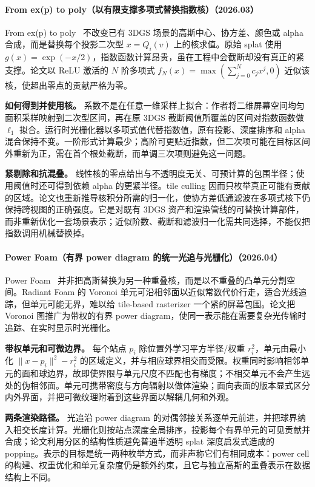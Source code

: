 \paragraph{From ex(p) to poly（以有限支撑多项式替换指数核）（2026.03）}
From ex(p) to poly~\cite{2603_18707} 不改变已有 3DGS 场景的高斯中心、协方差、颜色或 alpha 合成，而是替换每个投影二次型 $x=Q_i(v)$ 上的核求值。原始 splat 使用 $g(x)=\exp(-x/2)$，指数函数计算昂贵，虽在工程中会截断却没有真正的紧支撑。论文以 ReLU 激活的 $N$ 阶多项式 $f_N(x)=\max(\sum_{j=0}^N c_jx^j,0)$ 近似该核，使超出零点的贡献严格为零。

\textbf{如何得到并使用核。} 系数不是在任意一维采样上拟合：作者将二维屏幕空间均匀面积采样映射到二次型区间，再在原 3DGS 截断阈值所覆盖的区间对指数函数做 $\ell_1$ 拟合。运行时光栅化器以多项式值代替指数值，原有投影、深度排序和 alpha 混合保持不变。一阶形式计算最少；高阶可更贴近指数，但二次项可能在目标区间外重新为正，需在首个根处截断，而单调三次项则避免这一问题。

\textbf{紧剔除和抗混叠。} 线性核的零点给出与不透明度无关、可预计算的包围半径；使用阈值时还可得到依赖 alpha 的更紧半径。tile culling 因而只枚举真正可能有贡献的区域。论文也重新推导核积分所需的归一化，使协方差低通滤波在多项式核下仍保持跨视图的正确强度。它是对既有 3DGS 资产和渲染管线的可替换计算部件，而非重新优化一套场景表示；近似阶数、截断和滤波归一化需共同选择，不能仅把指数调用机械替换掉。

\paragraph{Power Foam（有界 power diagram 的统一光追与光栅化）（2026.04）}
Power Foam~\cite{2604_24994} 并非把高斯替换为另一种重叠核，而是以不重叠的凸单元分割空间。Radiant Foam 的 Voronoi 单元可沿相邻面以近似常数代价行走，适合光线追踪，但单元可能无界，难以给 tile-based rasterizer 一个紧的屏幕包围。论文把 Voronoi 图推广为带权的有界 power diagram，使同一表示能在需要复杂光传输时追踪、在实时显示时光栅化。

\textbf{带权单元和可微边界。} 每个站点 $p_i$ 除位置外学习平方半径/权重 $r_i^2$，单元由最小化 $\|x-p_i\|^2-r_i^2$ 的区域定义，并与相应球界相交而受限。权重同时影响相邻单元的面和球边界，故即使界限与单元尺度不匹配也有梯度；不相交单元不会产生远处的伪相邻面。单元可携带密度与方向辐射以做体渲染；面向表面的版本显式区分内外界面，并把可微纹理附着到这些界面以解耦几何和外观。

\textbf{两条渲染路径。} 光追沿 power diagram 的对偶邻接关系逐单元前进，并把球界纳入相交长度计算。光栅化则按站点深度全局排序，投影每个有界单元的可见贡献并合成；论文利用分区的结构性质避免普通半透明 splat 深度启发式造成的 popping。表示的目标是统一两种枚举方式，而非声称它们有相同成本：power cell 的构建、权重优化和单元复杂度仍是额外约束，且它与独立高斯的重叠表示在数据结构上不同。

